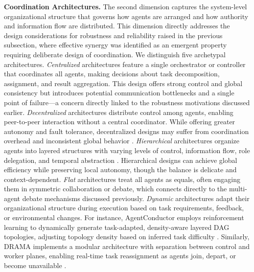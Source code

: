\documentclass[11pt]{article}
\begin{document}
\textbf{Coordination Architectures.} The second dimension captures the system-level organizational structure that governs how agents are arranged and how authority and information flow are distributed. This dimension directly addresses the design considerations for robustness and reliability raised in the previous subsection, where effective synergy was identified as an emergent property requiring deliberate design of coordination. We distinguish five archetypal architectures. \emph{Centralized} architectures feature a single orchestrator or controller that coordinates all agents, making decisions about task decomposition, assignment, and result aggregation. This design offers strong control and global consistency but introduces potential communication bottlenecks and a single point of failure---a concern directly linked to the robustness motivations discussed earlier. \emph{Decentralized} architectures distribute control among agents, enabling peer-to-peer interaction without a central coordinator. While offering greater autonomy and fault tolerance, decentralized designs may suffer from coordination overhead and inconsistent global behavior \cite{ref45}. \emph{Hierarchical} architectures organize agents into layered structures with varying levels of control, information flow, role delegation, and temporal abstraction \cite{ref46}. Hierarchical designs can achieve global efficiency while preserving local autonomy, though the balance is delicate and context-dependent. \emph{Flat} architectures treat all agents as equals, often engaging them in symmetric collaboration or debate, which connects directly to the multi-agent debate mechanisms discussed previously. \emph{Dynamic} architectures adapt their organizational structure during execution based on task requirements, feedback, or environmental changes. For instance, AgentConductor employs reinforcement learning to dynamically generate task-adapted, density-aware layered DAG topologies, adjusting topology density based on inferred task difficulty \cite{ref47}. Similarly, DRAMA implements a modular architecture with separation between control and worker planes, enabling real-time task reassignment as agents join, depart, or become unavailable \cite{ref48}.
\end{document}
